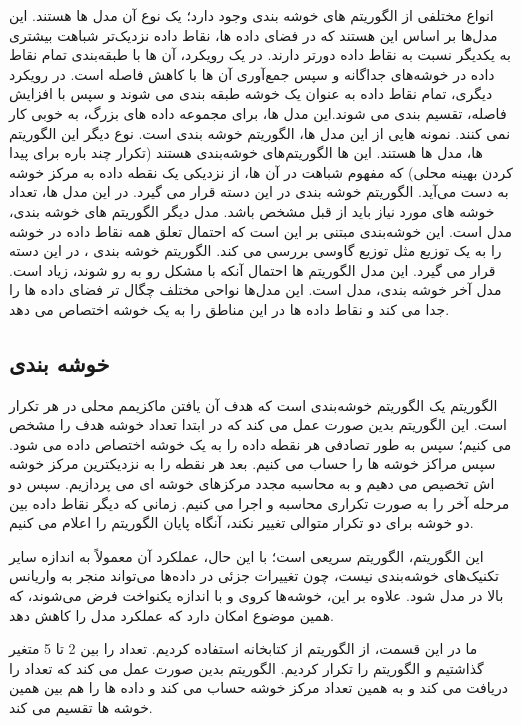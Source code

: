\documentclass[12pt,onecolumn,a4paper]{article}
\begin{document}
انواع مختلفی از الگوریتم های خوشه بندی وجود دارد؛ یک نوع آن  مدل ها هستند. این مدل‌ها بر اساس این هستند که در فضای داده ها، نقاط داده نزدیک‌تر شباهت بیشتری به یکدیگر نسبت به نقاط داده دورتر دارند. در یک رویکرد، آن ها با طبقه‌بندی تمام نقاط داده در خوشه‌های جداگانه و سپس جمع‌آوری آن ها با کاهش فاصله است. در رویکرد دیگری، تمام نقاط داده به عنوان یک خوشه طبقه بندی می شوند و سپس با افزایش فاصله، تقسیم بندی می شوند.این مدل ها، برای مجموعه داده های بزرگ، به خوبی کار نمی کنند. نمونه هایی از این مدل ها، الگوریتم خوشه بندی  است. نوع دیگر این الگوریتم ها،  مدل ها هستند. این ها الگوریتم‌های خوشه‌بندی  هستند (تکرار چند باره برای پیدا کردن بهینه محلی) که مفهوم شباهت در آن ها، از نزدیکی یک نقطه داده به مرکز خوشه‌ به دست می‌آید. الگوریتم خوشه بندی  در این دسته قرار می گیرد. در این مدل ها، تعداد خوشه های مورد نیاز باید از قبل مشخص باشد. مدل دیگر الگوریتم های خوشه بندی، مدل  است. این خوشه‌بندی مبتنی بر این است که احتمال تعلق همه نقاط داده در خوشه را به یک توزیع مثل توزیع گاوسی بررسی می کند. الگوریتم خوشه بندی ، در این دسته قرار می گیرد. این مدل الگوریتم ها احتمال آنکه با مشکل  رو به رو شوند، زیاد است. مدل آخر خوشه بندی، مدل  است. این مدل‌ها نواحی مختلف چگال تر فضای داده ها را جدا می کند و نقاط داده ها در این مناطق را به یک خوشه اختصاص می دهد.

\subsection{خوشه بندی }
الگوریتم  یک الگوریتم خوشه‌بندی  است که هدف آن یافتن ماکزیمم محلی در هر تکرار است. این الگوریتم بدین صورت عمل می کند که در ابتدا تعداد خوشه هدف را مشخص می کنیم؛ سپس به طور تصادفی هر نقطه داده را به یک خوشه اختصاص داده می شود. سپس مراکز خوشه ها را حساب می کنیم. بعد هر نقطه را به نزدیکترین مرکز خوشه اش تخصیص می دهیم و به محاسبه مجدد مرکزهای خوشه ای می پردازیم. سپس دو مرحله آخر را به صورت تکراری محاسبه و اجرا می کنیم. زمانی که دیگر نقاط داده بین دو خوشه برای دو تکرار متوالی تغییر نکند، آنگاه پایان الگوریتم را اعلام می کنیم.

این الگوریتم، الگوریتم سریعی است؛ با این حال، عملکرد آن معمولاً به اندازه سایر تکنیک‌های خوشه‌بندی نیست، چون تغییرات جزئی در داده‌ها می‌تواند منجر به واریانس بالا در مدل شود. علاوه بر این، خوشه‌ها کروی و با اندازه یکنواخت فرض می‌شوند، که همین موضوع امکان دارد که عملکرد مدل را کاهش دهد.

ما در این قسمت، از الگوریتم  از کتابخانه  استفاده کردیم.
تعداد  را بین 2 تا 5 متغیر گذاشتیم و الگوریتم را تکرار کردیم. الگوریتم بدین صورت عمل می کند که تعداد  را دریافت می کند و به همین تعداد مرکز خوشه حساب می کند و داده ها را هم بین همین خوشه ها تقسیم می کند.
\end{document}
